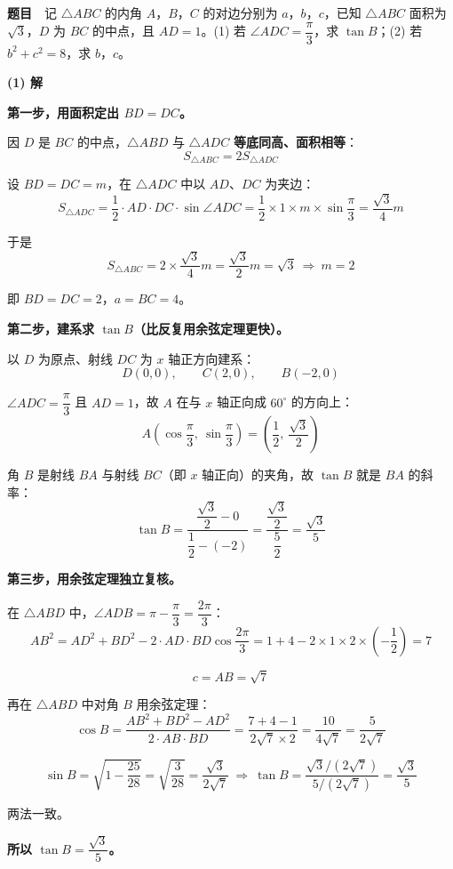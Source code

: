 \textbf{题目}　记 $\triangle ABC$ 的内角 $A$，$B$，$C$ 的对边分别为 $a$，$b$，$c$，已知 $\triangle ABC$ 面积为 $\sqrt3$，$D$ 为 $BC$ 的中点，且 $AD=1$。(1) 若 $\angle ADC=\dfrac\pi3$，求 $\tan B$；(2) 若 $b^{2}+c^{2}=8$，求 $b$，$c$。

\par\medskip

\textbf{(1) 解}

\textbf{第一步，用面积定出 $BD=DC$。}

因 $D$ 是 $BC$ 的中点，$\triangle ABD$ 与 $\triangle ADC$ \textbf{等底同高、面积相等}：
\[S_{\triangle ABC}=2S_{\triangle ADC}\]

设 $BD=DC=m$，在 $\triangle ADC$ 中以 $AD$、$DC$ 为夹边：
\[S_{\triangle ADC}=\frac12\cdot AD\cdot DC\cdot\sin\angle ADC=\frac12\times1\times m\times\sin\frac\pi3=\frac{\sqrt3}4m\]

于是
\[S_{\triangle ABC}=2\times\frac{\sqrt3}4m=\frac{\sqrt3}2m=\sqrt3\ \Longrightarrow\ m=2\]

即 $BD=DC=2$，$a=BC=4$。

\textbf{第二步，建系求 $\tan B$（比反复用余弦定理更快）。}

以 $D$ 为原点、射线 $DC$ 为 $x$ 轴正方向建系：
\[D(0,0),\qquad C(2,0),\qquad B(-2,0)\]

$\angle ADC=\dfrac\pi3$ 且 $AD=1$，故 $A$ 在与 $x$ 轴正向成 $60^\circ$ 的方向上：
\[A\left(\cos\frac\pi3,\ \sin\frac\pi3\right)=\left(\frac12,\ \frac{\sqrt3}2\right)\]

角 $B$ 是射线 $BA$ 与射线 $BC$（即 $x$ 轴正向）的夹角，故 $\tan B$ 就是 $BA$ 的斜率：
\[\tan B=\frac{\dfrac{\sqrt3}2-0}{\dfrac12-(-2)}=\frac{\dfrac{\sqrt3}2}{\dfrac52}=\frac{\sqrt3}5\]

\textbf{第三步，用余弦定理独立复核。}

在 $\triangle ABD$ 中，$\angle ADB=\pi-\dfrac\pi3=\dfrac{2\pi}3$：
\[AB^{2}=AD^{2}+BD^{2}-2\cdot AD\cdot BD\cos\frac{2\pi}3=1+4-2\times1\times2\times\left(-\frac12\right)=7\]

\[c=AB=\sqrt7\]

再在 $\triangle ABD$ 中对角 $B$ 用余弦定理：
\[\cos B=\frac{AB^{2}+BD^{2}-AD^{2}}{2\cdot AB\cdot BD}=\frac{7+4-1}{2\sqrt7\times2}=\frac{10}{4\sqrt7}=\frac5{2\sqrt7}\]

\[\sin B=\sqrt{1-\frac{25}{28}}=\sqrt{\frac3{28}}=\frac{\sqrt3}{2\sqrt7}\ \Longrightarrow\ \tan B=\frac{\sqrt3/\left(2\sqrt7\right)}{5/\left(2\sqrt7\right)}=\frac{\sqrt3}5\]

两法一致。

\textbf{所以 $\tan B=\dfrac{\sqrt3}5$。}

